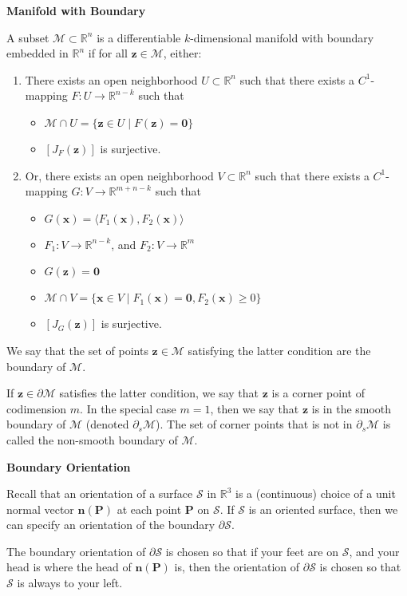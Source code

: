 \documentclass{article}
\newcommand{\R}{\mathbb{R}}
\newenvironment{definition}[1]{
    \par\noindent\textbf{#1}\par\noindent
}{
    \par \vspace{0.5cm}
}
\begin{document}
\begin{definition}{Manifold with Boundary}
A subset \(\mathcal{M} \subset \R^n\) is a differentiable \(k\)-dimensional manifold with boundary embedded in \(\R^n\) if for all \(\bm{z} \in \mathcal{M}\), either:
\begin{enumerate}
    \item There exists an open neighborhood \(U \subset \R^n\) such that there exists a \(C^1\)-mapping \(F : U \rightarrow \R^{n-k}\) such that
    \begin{itemize}
        \item \(\mathcal{M} \cap U = \{\bm{z} \in U \mid F(\bm{z}) = \bm{0}\}\)
        \item \([J_F(\bm{z})]\) is surjective.
    \end{itemize}
    \item Or, there exists an open neighborhood \(V \subset \R^n\) such that there exists a \(C^1\)-mapping \(G : V \rightarrow \R^{m+n-k}\) such that
    \begin{itemize}
        \item \(G(\bm{x}) = \langle F_1(\bm{x}), F_2(\bm{x}) \rangle\)
        \item \(F_1 : V \rightarrow \R^{n-k}\), and \(F_2 : V \rightarrow \R^m\)
        \item \(G(\bm{z}) = \bm{0}\)
        \item \(\mathcal{M} \cap V = \{\bm{x} \in V \mid F_1(\bm{x}) = \bm{0}, F_2(\bm{x}) \geq 0\}\)
        \item \([J_G(\bm{z})]\) is surjective.
    \end{itemize}
\end{enumerate}
We say that the set of points \(\bm{z} \in \mathcal{M}\) satisfying the latter condition are the boundary of \(\mathcal{M}\).

If \(\bm{z} \in \partial \mathcal{M}\) satisfies the latter condition, we say that \(\bm{z}\) is a corner point of codimension \(m\). In the special case \(m = 1\), then we say that \(\bm{z}\) is in the smooth boundary of \(\mathcal{M}\) (denoted \(\partial_s \mathcal{M}\)). The set of corner points that is not in \(\partial_s \mathcal{M}\) is called the non-smooth boundary of \(\mathcal{M}\).
\end{definition}


\begin{definition}{Boundary Orientation}
Recall that an orientation of a surface \(\mathcal{S}\) in \(\R^3\) is a (continuous) choice of a unit normal vector \(\bm{n}(\bm{P})\) at each point \(\bm{P}\) on \(\mathcal{S}\). If \(\mathcal{S}\) is an oriented surface, then we can specify an orientation of the boundary \(\partial \mathcal{S}\).

The boundary orientation of \(\partial \mathcal{S}\) is chosen so that if your feet are on \(\mathcal{S}\), and your head is where the head of \(\bm{n}(\bm{P})\) is, then the orientation of \(\partial \mathcal{S}\) is chosen so that \(\mathcal{S}\) is always to your left.
\end{definition}
\end{document}
